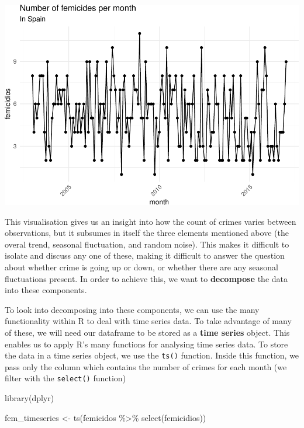 \documentclass[
]{book}
\makeatletter
\newenvironment{Shaded}{\begin{snugshade}}{\end{snugshade}}
\newcommand{\FunctionTok}[1]{\textcolor[rgb]{0,0,0}{#1}}
\newcommand{\NormalTok}[1]{#1}
\newcommand{\OtherTok}[1]{\textcolor[rgb]{0.37,0.37,0.37}{#1}}
\newcommand{\SpecialCharTok}[1]{\textcolor[rgb]{0,0,0}{#1}}
\newenvironment{kframe}{%
\medskip{}
\setlength{\fboxsep}{.8em}
 \def\at@end@of@kframe{}%
 \ifinner\ifhmode%
  \def\at@end@of@kframe{\end{minipage}}%
  \begin{minipage}{\columnwidth}%
 \fi\fi%
 \def\FrameCommand##1{\hskip\@totalleftmargin \hskip-\fboxsep
 \colorbox{shadecolor}{##1}\hskip-\fboxsep
     \hskip-\linewidth \hskip-\@totalleftmargin \hskip\columnwidth}%
 \MakeFramed {\advance\hsize-\width
   \@totalleftmargin\z@ \linewidth\hsize
   \@setminipage}}%
 {\par\unskip\endMakeFramed%
 \at@end@of@kframe}
\renewenvironment{Shaded}{\begin{kframe}}{\end{kframe}}
\makeatother
\begin{document}
\includegraphics{crime_mapping_files/figure-latex/ggplottime-1.pdf}

This visualisation gives us an insight into how the count of crimes varies between observations, but it subsumes in itself the three elements mentioned above (the overal trend, seasonal fluctuation, and random noise). This makes it difficult to isolate and discuss any one of these, making it difficult to answer the question about whether crime is going up or down, or whether there are any seasonal fluctuations present. In order to achieve this, we want to \textbf{decompose} the data into these components.

To look into decomposing into these components, we can use the many functionality within R to deal with time series data. To take advantage of many of these, we will need our dataframe to be stored as a \textbf{time series} object. This enables us to apply R's many functions for analysing time series data. To store the data in a time series object, we use the \texttt{ts()} function. Inside this function, we pass only the column which contains the number of crimes for each month (we filter with the \texttt{select()} function)

\begin{Shaded}
\begin{Highlighting}[]
\FunctionTok{library}\NormalTok{(dplyr)}
 
\NormalTok{fem\_timeseries }\OtherTok{\textless{}{-}} \FunctionTok{ts}\NormalTok{(femicidos }\SpecialCharTok{\%\textgreater{}\%} 
                       \FunctionTok{select}\NormalTok{(femicidios))}
\end{Highlighting}
\end{Shaded}
\end{document}
